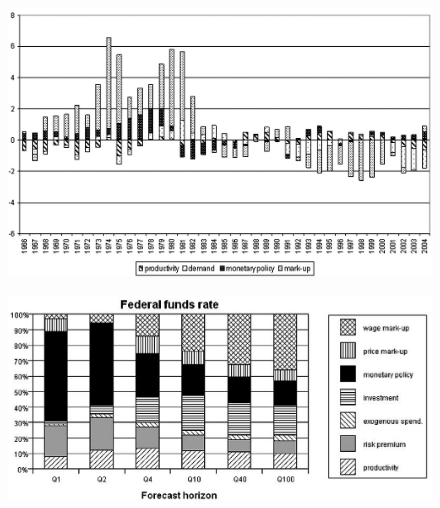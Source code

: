 \documentclass{beamer}
\begin{document}
\begin{frame}
  \begin{figure}
    \includegraphics[scale=.8]{sw_figure4_inflation.eps}
  \end{figure}
\end{frame}

\begin{frame}
  \begin{figure}
    \includegraphics[scale=.8]{sw_figure1_interest.eps}
  \end{figure}
\end{frame}
\end{document}
